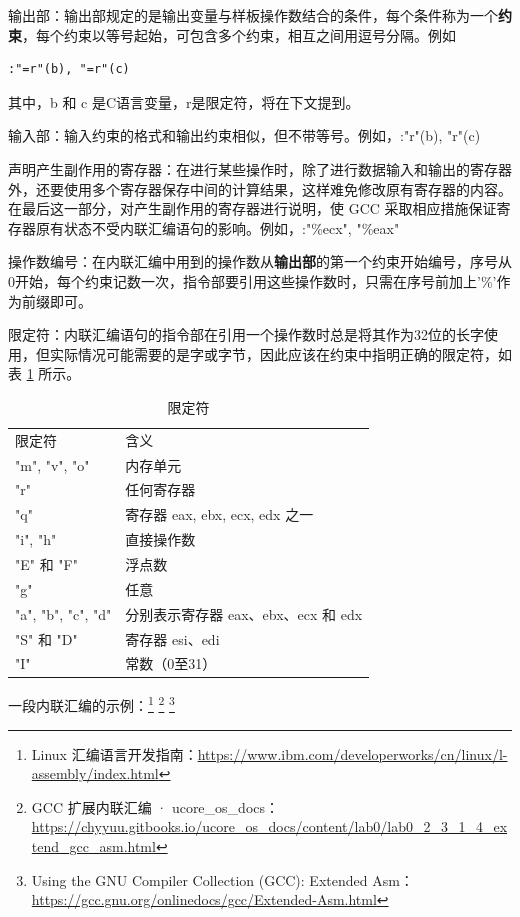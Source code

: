 输出部：输出部规定的是输出变量与样板操作数结合的条件，每个条件称为一个\textbf{约束}，每个约束以等号起始，可包含多个约束，相互之间用逗号分隔。例如

\begin{lstlisting}
:"=r"(b), "=r"(c)
\end{lstlisting}

其中，b 和 c 是C语言变量，r是限定符，将在下文提到。

输入部：输入约束的格式和输出约束相似，但不带等号。例如，:"r"(b), "r"(c)

声明产生副作用的寄存器：在进行某些操作时，除了进行数据输入和输出的寄存器外，还要使用多个寄存器保存中间的计算结果，这样难免修改原有寄存器的内容。在最后这一部分，对产生副作用的寄存器进行说明，使 GCC 采取相应措施保证寄存器原有状态不受内联汇编语句的影响。例如，:"\%ecx", "\%eax"

操作数编号：在内联汇编中用到的操作数从\textbf{输出部}的第一个约束开始编号，序号从0开始，每个约束记数一次，指令部要引用这些操作数时，只需在序号前加上'\%'作为前缀即可。

限定符：内联汇编语句的指令部在引用一个操作数时总是将其作为32位的长字使用，但实际情况可能需要的是字或字节，因此应该在约束中指明正确的限定符，如表 \ref{tab:限定符} 所示。

\begin{table}[]
\caption{限定符}
\label{tab:限定符}
\begin{tabular}{ll}
限定符 & 含义 \\
"m", "v", "o" & 内存单元 \\
"r" & 任何寄存器 \\
"q" & 寄存器 eax, ebx, ecx, edx 之一 \\
"i", "h" & 直接操作数 \\
"E" 和 "F" & 浮点数 \\
"g" & 任意 \\
"a", "b", "c", "d" & 分别表示寄存器 eax、ebx、ecx 和 edx \\
"S" 和 "D" & 寄存器 esi、edi \\
"I" & 常数（0至31）
\end{tabular}
\end{table}

一段内联汇编的示例：\footnote{Linux 汇编语言开发指南：\url{https://www.ibm.com/developerworks/cn/linux/l-assembly/index.html}}
\footnote{GCC 扩展内联汇编 · ucore\_os\_docs：\url{https://chyyuu.gitbooks.io/ucore\_os\_docs/content/lab0/lab0\_2\_3\_1\_4\_extend\_gcc\_asm.html}}
\footnote{Using the GNU Compiler Collection (GCC): Extended Asm：\url{https://gcc.gnu.org/onlinedocs/gcc/Extended-Asm.html}}

